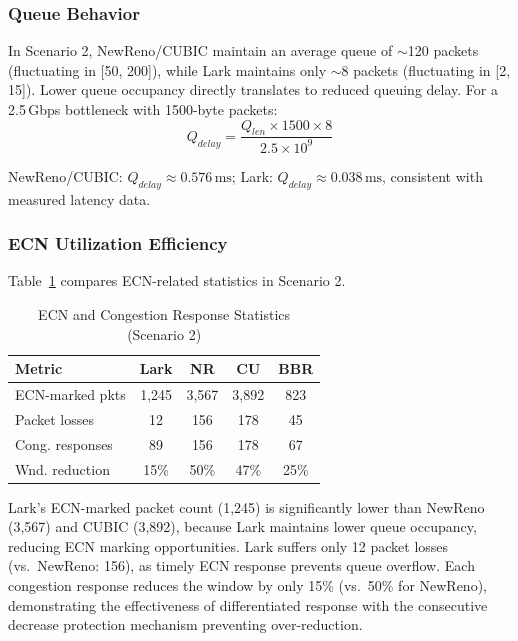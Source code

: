 \documentclass[10pt,twocolumn]{article}
\begin{document}
\subsubsection{Queue Behavior}

In Scenario 2, NewReno/CUBIC maintain an average queue of $\sim$120 packets (fluctuating in [50, 200]), while Lark maintains only $\sim$8 packets (fluctuating in [2, 15]). Lower queue occupancy directly translates to reduced queuing delay. For a 2.5\,Gbps bottleneck with 1500-byte packets:
\begin{equation}
Q_{delay} = \frac{Q_{len} \times 1500 \times 8}{2.5 \times 10^9}
\end{equation}

NewReno/CUBIC: $Q_{delay} \approx 0.576\,\text{ms}$; Lark: $Q_{delay} \approx 0.038\,\text{ms}$, consistent with measured latency data.

\subsubsection{ECN Utilization Efficiency}

Table~\ref{tab:ecn} compares ECN-related statistics in Scenario 2.

\begin{table}[htbp]
\centering
\caption{ECN and Congestion Response Statistics (Scenario 2)}
\label{tab:ecn}
\small
\begin{tabular}{lcccc}
\toprule
\textbf{Metric} & \textbf{Lark} & \textbf{NR} & \textbf{CU} & \textbf{BBR} \\
\midrule
ECN-marked pkts & 1,245 & 3,567 & 3,892 & 823 \\
Packet losses & 12 & 156 & 178 & 45 \\
Cong. responses & 89 & 156 & 178 & 67 \\
Wnd. reduction & 15\% & 50\% & 47\% & 25\% \\
\bottomrule
\end{tabular}
\end{table}

Lark's ECN-marked packet count (1,245) is significantly lower than NewReno (3,567) and CUBIC (3,892), because Lark maintains lower queue occupancy, reducing ECN marking opportunities. Lark suffers only 12 packet losses (vs.\ NewReno: 156), as timely ECN response prevents queue overflow. Each congestion response reduces the window by only 15\% (vs.\ 50\% for NewReno), demonstrating the effectiveness of differentiated response with the consecutive decrease protection mechanism preventing over-reduction.
\end{document}
